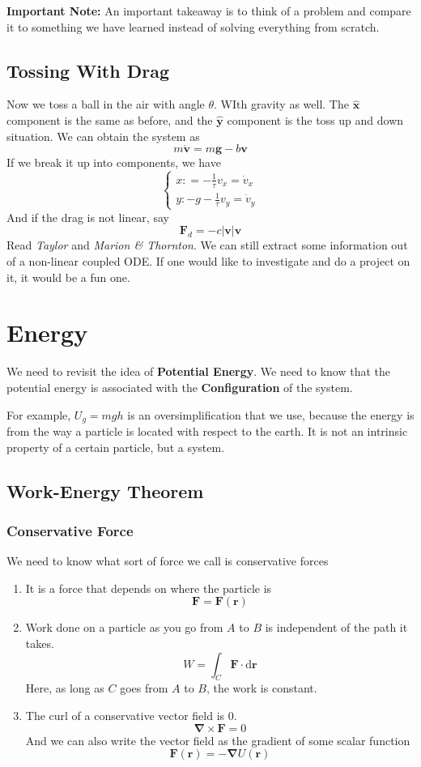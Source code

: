 \documentclass[12pt]{article}
\newcommand{\curl}{\boldsymbol{\nabla}\times}
\newcommand{\abso}[1]{\left|#1 \right|}
\newcommand{\unx}{\hat{\mathbf{x}}}
\newcommand{\uny}{\hat{\mathbf{y}}}
\begin{document}
\textbf{Important Note:} An important takeaway is to think of a problem and compare it to something we have learned instead of solving everything from scratch. 

\subsection{Tossing With Drag}
Now we toss a ball in the air with angle $\theta$. WIth gravity as well. The $\unx$ component is the same as before, and the $\uny$ component is the toss up and down situation. We can obtain the system as
\[
m\dot{\mathbf{v}} = m\mathbf{g} - b\mathbf{v}
\]
If we break it up into components, we have
\[
\begin{cases}
    x\colon = -\frac{1}{\tau}v_x = \dot{v}_x\\
    y\colon -g-\frac{1}{\tau}v_y = \dot{v}_y
\end{cases}
\]
And if the drag is not linear, say
\[
\mathbf{F}_d = -c\abso{\mathbf{v}}\mathbf{v}
\]
Read \textit{Taylor} and \textit{Marion \& Thornton}. We can still extract some information out of a non-linear coupled ODE. If one would like to investigate and do a project on it, it would be a fun one. 

\section{Energy}
We need to revisit the idea of \textbf{Potential Energy}. We need to know that the potential energy is associated with the \textbf{Configuration} of the system.

For example, $U_g = mgh$ is an oversimplification that we use, because the energy is from the way a particle is located with respect to the earth. It is not an intrinsic property of a certain particle, but a system.

\subsection{Work-Energy Theorem}
\subsubsection{Conservative Force}
We need to know what sort of force we call is conservative forces
\begin{enumerate}
    \item It is a force that depends on where the particle is
    \[
    \mathbf{F} = \mathbf{F}(\mathbf{r})
    \]
    
    \item Work done on a particle as you go from $A$ to $B$ is independent of the path it takes. 
    \[
    W = \int_C \mathbf{F}\cdot \text{d}\mathbf{r}
    \]
    Here, as long as $C$ goes from $A$ to $B$, the work is constant. 
    
    \item The curl of a conservative vector field is $0$.
    \[
    \curl \mathbf{F} = 0
    \]
    And we can also write the vector field as the gradient of some scalar function
    \[
    \mathbf{F}(\mathbf{r}) = -\boldsymbol{\nabla}U(\mathbf{r})
    \]
\end{enumerate}
\end{document}
